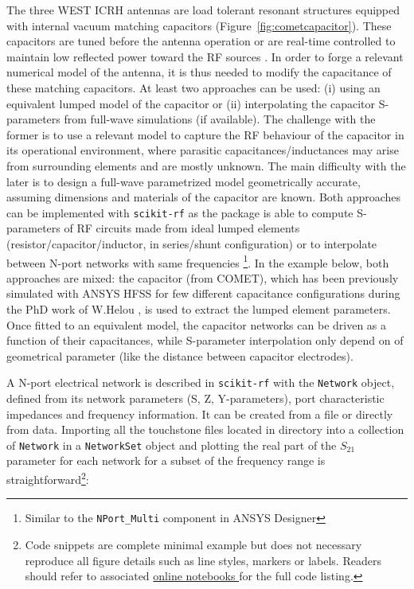 The three WEST ICRH antennas are load tolerant resonant structures equipped with internal vacuum matching capacitors (Figure~\ref{fig:cometcapacitor}). These capacitors are tuned before the antenna operation or are real-time controlled to maintain low reflected power toward the RF sources . In order to forge a relevant numerical model of the antenna, it is thus needed to modify the capacitance of these matching capacitors. At least two approaches can be used: (i) using an equivalent lumped model of the capacitor or (ii) interpolating the capacitor S-parameters from full-wave simulations (if available). The challenge with the former is to use a relevant model to capture the RF behaviour of the capacitor in its operational environment, where parasitic capacitances/inductances may arise from surrounding elements and are mostly unknown. The main difficulty with the later is to design a full-wave parametrized model geometrically accurate, assuming dimensions and materials of the capacitor are known. Both approaches can be implemented with \texttt{scikit-rf} as the package is able to compute S-parameters of RF circuits made from ideal lumped elements (resistor/capacitor/inductor, in series/shunt configuration)  or to interpolate between N-port networks with same frequencies \footnote{Similar to the \texttt{NPort\_Multi} component in ANSYS Designer}. In the example below, both approaches are mixed: the capacitor (from COMET), which has been previously simulated with ANSYS HFSS for few different capacitance configurations during the PhD work of W.Helou , is used to extract the lumped element parameters. Once fitted to an equivalent model, the capacitor networks can be driven as a function of their capacitances, while S-parameter interpolation only depend on of geometrical parameter (like the distance between capacitor electrodes).

A N-port electrical network is described in \texttt{scikit-rf} with the \texttt{Network} object, defined from its network parameters (S, Z, Y-parameters), port characteristic impedances and frequency information. It can be created from a file or directly from data. Importing all the touchstone files located in directory into a collection of \texttt{Network} in a \texttt{NetworkSet} object and plotting the real part of the $S_{21}$ parameter for each network for a subset of the frequency range is straightforward\footnote{Code snippets are complete minimal example but does not necessary reproduce all figure details such as line styles, markers or labels. Readers should refer to associated \href{https://doi.org/10.5281/zenodo.2668370}{online notebooks }for the full code listing.}:

